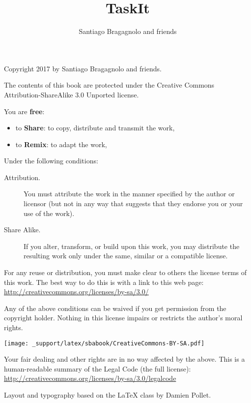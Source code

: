 \documentclass[10pt,twoside,english]{_support/latex/sbabook/sbabook}
\title{TaskIt}
\author{Santiago Bragagnolo and friends}
\begin{document}
\maketitle
\pagestyle{titlingpage}
\thispagestyle{titlingpage} %

\cleartoverso
{\small

  Copyright 2017 by Santiago Bragagnolo and friends.

  The contents of this book are protected under the Creative Commons
  Attribution-ShareAlike 3.0 Unported license.

  You are \textbf{free}:
  \begin{itemize}
  \item to \textbf{Share}: to copy, distribute and transmit the work,
  \item to \textbf{Remix}: to adapt the work,
  \end{itemize}

  Under the following conditions:
  \begin{description}
  \item[Attribution.] You must attribute the work in the manner specified by the
    author or licensor (but not in any way that suggests that they endorse you
    or your use of the work).
  \item[Share Alike.] If you alter, transform, or build upon this work, you may
    distribute the resulting work only under the same, similar or a compatible
    license.
  \end{description}

  For any reuse or distribution, you must make clear to others the
  license terms of this work. The best way to do this is with a link to
  this web page: \\
  \url{http://creativecommons.org/licenses/by-sa/3.0/}

  Any of the above conditions can be waived if you get permission from
  the copyright holder. Nothing in this license impairs or restricts the
  author's moral rights.

  \begin{center}
    \texttt{[image: \_support/latex/sbabook/CreativeCommons-BY-SA.pdf]}
  \end{center}

  Your fair dealing and other rights are in no way affected by the
  above. This is a human-readable summary of the Legal Code (the full
  license): \\
  \url{http://creativecommons.org/licenses/by-sa/3.0/legalcode}

  \vfill

  Layout and typography based on the  \LaTeX{} class by Damien
  Pollet.
}
\end{document}
